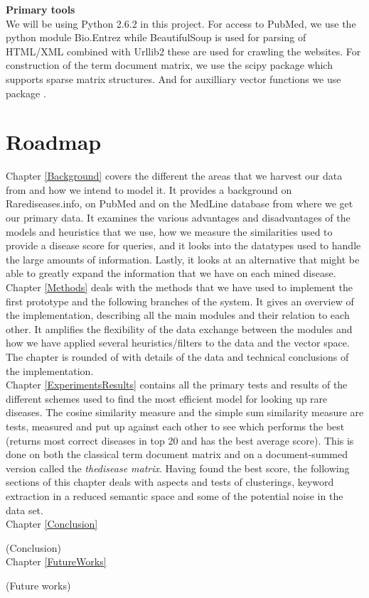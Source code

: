 \textbf{Primary tools} \\ We will be using Python 2.6.2
\cite{PythonLanguage} in this project. For access to PubMed, we use
the python module Bio.Entrez \cite{EntrezProgUtil} while BeautifulSoup
\cite{BS} is used for parsing of HTML/XML combined with Urllib2
\cite{UL2} these are used for crawling the websites. For construction
of the term document matrix, we use the scipy package \cite{SciPy}
which supports sparse matrix structures. And for auxilliary vector
functions we use package \cite{NumPy}.

\section{Roadmap}

Chapter \ref{Background} covers the different the areas that we harvest our
data from and how we intend to model it. It provides a background on
Rarediseases.info, on PubMed and on the MedLine database from where we
get our primary data. It examines the various advantages and
disadvantages of the models and heuristics that we use, how we measure
the similarities used to provide a disease score for queries, and it
looks into the datatypes used to handle the large amounts of
information. Lastly, it looks at an alternative that might be able to
greatly expand the information that we have on each mined disease.\\

Chapter \ref{Methods} deals with the methods that we have used to implement
the first prototype and the following branches of the system. It gives
an overview of the implementation, describing all the main modules and
their relation to each other. It amplifies the flexibility of the data
exchange between the modules and how we have applied several
heuristics/filters to the data and the vector space. The chapter is
rounded of with details of the data and technical conclusions of the
implementation.\\

Chapter \ref{ExperimentsResults} contains all the primary tests and results of the different schemes used to find the most efficient model for looking up rare diseases. The cosine similarity measure and the simple sum similarity measure are tests, measured and put up against each other to see which performs the best (returns most correct diseases in top 20 and has the best average score). This is done on both the classical term document matrix and on a document-summed version called the \textit{thedisease matrix}. Having found the best score, the following sections of this chapter deals with aspects and tests of clusterings, keyword extraction in a reduced semantic space and some of the potential noise in the data set.\\

Chapter \ref{Conclusion}

(Conclusion)\\

Chapter \ref{FutureWorks}

(Future works) \\
